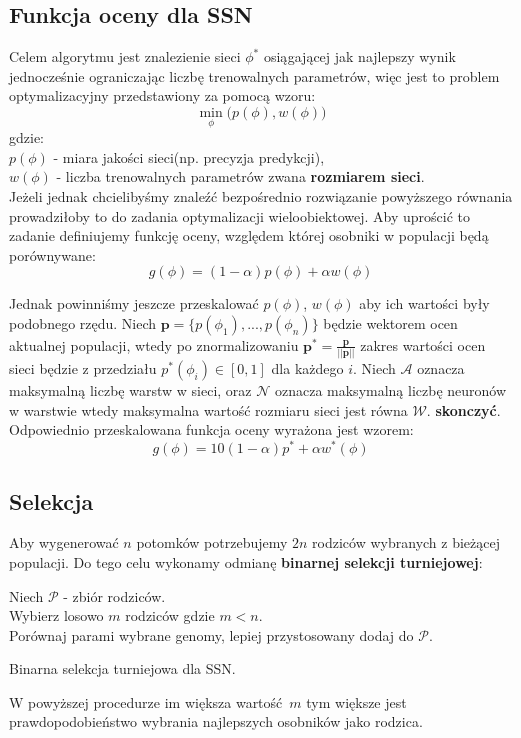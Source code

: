 \documentclass{article}
\renewcommand{\vec}[1]{\mathbf{#1}}
\begin{document}
\subsection{Funkcja oceny dla SSN}
Celem algorytmu jest znalezienie sieci $\phi^{*}$ osiągającej jak najlepszy wynik jednocześnie
ograniczając liczbę trenowalnych parametrów, więc jest to problem optymalizacyjny 
przedstawiony za pomocą wzoru:
\begin{equation}
	\underset{\phi}{\min}\big(p(\phi), w(\phi)\big)
\end{equation}
gdzie:\\
$p(\phi)$ - miara jakości sieci(np. precyzja predykcji),\\
$w(\phi)$ - liczba trenowalnych parametrów zwana \textbf{rozmiarem sieci}.\\
Jeżeli jednak chcielibyśmy znaleźć bezpośrednio rozwiązanie powyższego równania
prowadziłoby to do zadania optymalizacji wieloobiektowej. Aby uprościć to zadanie
definiujemy funkcję oceny, względem której osobniki w populacji będą porównywane:
\begin{equation}
	g(\phi) = (1 - \alpha)p(\phi) + \alpha w(\phi)
\end{equation}

Jednak powinniśmy jeszcze przeskalować $p(\phi)$, $w(\phi)$ aby ich wartości były podobnego 
rzędu. Niech $\vec{p} = \{p(\phi_1), ..., p(\phi_n)\}$ będzie wektorem ocen aktualnej populacji,
wtedy po znormalizowaniu $\vec{p}^{*} = \frac{\vec{p}}{||\vec{p}||}$ zakres wartości ocen sieci
będzie z przedziału $p^{*}(\phi_i) \in [0, 1]$ dla każdego $i$. Niech $\mathcal{A}$ oznacza
maksymalną liczbę warstw w sieci, oraz $\mathcal{N}$ oznacza maksymalną liczbę neuronów w 
warstwie wtedy maksymalna wartość rozmiaru sieci jest równa $\mathcal{W}$.
\textbf{skonczyć}.\\
Odpowiednio przeskalowana funkcja oceny wyrażona jest wzorem:
\begin{equation}
	g(\phi) = 10(1 - \alpha)p^{*} + \alpha w^{*}(\phi)
\end{equation}

\subsection{Selekcja}
Aby wygenerować $n$ potomków potrzebujemy $2n$ rodziców wybranych z bieżącej populacji.
Do tego celu wykonamy odmianę \textbf{binarnej selekcji turniejowej}:\\
\begin{algorithm}[H]
 Niech $\mathcal{P}$ - zbiór rodziców.\\
 Wybierz losowo $m$ rodziców gdzie $m < n$.\\
  {
	Porównaj parami wybrane genomy, lepiej przystosowany dodaj do $\mathcal{P}$.\\
 }
 \caption{Binarna selekcja turniejowa dla SSN.}
\end{algorithm}
W powyższej procedurze im większa wartość $m$ tym większe jest prawdopodobieństwo wybrania
najlepszych osobników jako rodzica.
\end{document}
